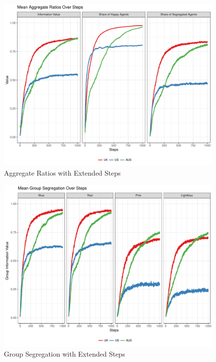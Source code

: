 \documentclass[12pt, a4paper]{article}
\begin{document}
	\begin{figure}[bp!]
		\centering
		\caption{Aggregate Ratios with Extended Steps}
		\includegraphics[scale=0.6]{./Plots/agg_ratios_1000.pdf}
	\end{figure}
	
	\begin{figure}[bp!]
		\centering
		\caption{Group Segregation with Extended Steps}
		\includegraphics[scale=0.6]{./Plots/grp_ratios_1000.pdf}
	\end{figure}
\end{document}
